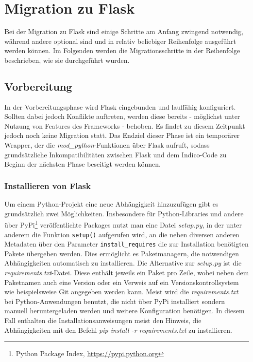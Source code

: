 \chapter{Migration zu Flask}
Bei der Migration zu Flask sind einige Schritte am Anfang zwingend notwendig, während andere
optional sind und in relativ beliebiger Reihenfolge ausgeführt werden können. Im Folgenden
werden die Migrationsschritte in der Reihenfolge beschrieben, wie sie durchgeführt wurden.


\section{Vorbereitung}
In der Vorbereitungsphase wird Flask eingebunden und lauffähig konfiguriert. Sollten dabei jedoch
Konflikte auftreten, werden diese bereits - möglichst unter Nutzung von Features des Frameworks -
behoben. Es findet zu diesem Zeitpunkt jedoch noch keine Migration statt. Das Endziel dieser Phase
ist ein temporärer Wrapper, der die \emph{mod\_python}-Funktionen über Flask aufruft, sodass
grundsätzliche Inkompatibilitäten zwischen Flask und dem Indico-Code zu Beginn der nächsten Phase
beseitigt werden können.


\subsection{Installieren von Flask}
Um einem Python-Projekt eine neue Abhängigkeit hinzuzufügen gibt es grundsätzlich zwei
Möglichkeiten. Insbesondere für Python-Libraries und andere über PyPi\footnote{Python Package Index,
\href{https://pypi.python.org}{https://pypi.python.org}} veröffentlichte Packages nutzt man eine
Datei \emph{setup.py}, in der unter anderem die Funktion \lstinline{setup()} aufgerufen wird, an die
neben diversen anderen Metadaten über den Parameter \lstinline{install_requires} die zur
Installation benötigten Pakete übergeben werden. Dies ermöglicht es Paketmanagern, die notwendigen
Abhängigkeiten automatisch zu installieren. Die Alternative zur \emph{setup.py} ist die
\emph{requirements.txt}-Datei. Diese enthält jeweils ein Paket pro Zeile, wobei neben dem Paketnamen
auch eine Version oder ein Verweis auf ein Versionskontrollsystem wie beispielsweise Git angegeben
werden kann. Meist wird die \emph{requirements.txt} bei Python-Anwendungen benutzt, die nicht über
PyPi installiert sondern manuell heruntergeladen werden und weitere Konfiguration benötigen. In
diesem Fall enthalten die Installationsanweisungen meist den Hinweis, die Abhängigkeiten mit den
Befehl \emph{pip install -r requirements.txt} zu installieren.

